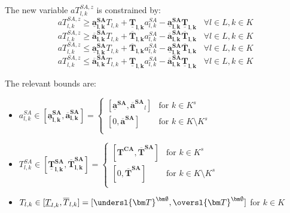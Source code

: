 The new variable $aT_{l,k}^{SA,z}$ is constrained by:
\begin{equation} \label{eq:aSAT1} 
aT_{l,k}^{SA,z} \geq \bm{\underline{a}^{SA}_{l,k}} T_{l,k} + \bm{\underline{T}_{l,k}} a_{l,k}^{SA} - \bm{\underline{a}^{SA}_{l,k}} \bm{\underline{T}_{l,k}}  \hspace{10pt} \forall l \in L, k \in K 
\end{equation}
\begin{equation} \label{eq:aSAT2} 
aT_{l,k}^{SA,z} \geq \bm{\overline{a}^{SA}_{l,k}} T_{l,k} + \bm{\overline{T}_{l,k}} a_{l,k}^{SA} - \bm{\overline{a}^{SA}_{l,k}} \bm{\overline{T}_{l,k}} \hspace{10pt} \forall l \in L, k \in K 
\end{equation}
\begin{equation} \label{eq:aSAT3} 
aT_{l,k}^{SA,z} \leq  \bm{\underline{a}^{SA}_{l,k}} T_{l,k} + \bm{\overline{T}_{l,k}} a_{l,k}^{SA} - \bm{\underline{a}^{SA}_{l,k}} \bm{\overline{T}_{l,k}} \hspace{10pt} \forall l \in L, k \in K 
\end{equation}
\begin{equation} \label{eq:aSAT4} 
aT_{l,k}^{SA,z} \leq  \bm{\overline{a}^{SA}_{l,k}} T_{l,k} + \bm{\underline{T}_{l,k}} a_{l,k}^{SA} - \bm{\overline{a}^{SA}_{l,k}} \bm{\underline{T}_{l,k}}  \hspace{10pt} \forall l \in L, k \in K 
\end{equation}

The relevant bounds are:

\begin{itemize}
\item $a_{l,k}^{SA} \in [\bm{\underline{a}^{SA}_{l,k}}, \bm{\overline{a}^{SA}_{l,k}}] = 
\left\{
\begin{array}{ll}
\![\bm{\underline{a}^{SA}},\bm{\overline{a}^{SA}}_l] & \mbox{for $k\in K^s$}\\
\![0,\bm{\overline{a}^{SA}}] & \mbox{for $k\in K\setminus K^s$}\\
\end{array}
\right.$

\item $T_{l,k}^{SA} \in [\bm{\underline{T}^{SA}_{l,k}}, \bm{\overline{T}^{SA}_{l,k}}] = 
\left\{
\begin{array}{ll}
\![\bm{T^{CA}},\bm{\overline{T}^{SA}}] & \mbox{for $k \in K^s$}\\
\![0,\bm{\overline{T}^{SA}}] & \mbox{for $k \in K \setminus K^s$}\\
\end{array}
\right.$

\item $T_{l,k}\in [\underline{T}_{l,k}, \overline{T}_{l,k}] = [\undersl{\bm T}^{\bm \emptyset} ,\oversl{\bm T}^{\bm \emptyset} ]$ for $k\in K$
\end{itemize}

